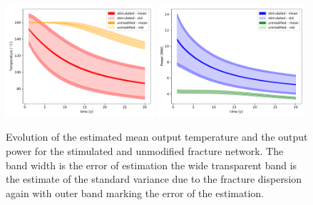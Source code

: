 \documentclass{article}
\newcommand{\degC}{$^\circ\mathrm{C}$}
\begin{document}
\begin{figure}[!htb]
\includegraphics[width=0.49\textwidth]{mlmc_random_frac/output_scenarios/output_por_disp_02/temp_comparison.pdf}
\includegraphics[width=0.49\textwidth]{mlmc_random_frac/output_scenarios/output_por_disp_02/power_comparison.pdf}
\caption{Evolution of the estimated mean output temperature and the output power for the stimulated and unmodified fracture network. The band width is the error of estimation the wide transparent band is the estimate of the standard variance due to the fracture dispersion again with outer band marking the error of the estimation.}
\label{fig:evolution_02}
\end{figure}





\end{document}
